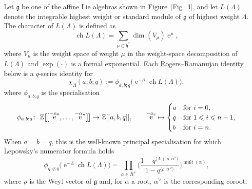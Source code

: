 \documentclass[pdftex]{sigma}
\numberwithin{equation}{section}
\newcommand{\ip}[2]{\langle#1,#2\rangle}
\renewcommand{\leq}{\leqslant}
\DeclareMathOperator{\mult}{mult}
\DeclareMathOperator{\eup}{e}
\DeclareMathOperator{\ch}{ch}
\newcommand{\La}{\Lambda}
\begin{document}
Let $\mathfrak{g}$ be one of the affine Lie algebras shown in
Figure~\ref{Fig_1}, and let $L(\La)$ denote the integrable highest
weight or standard module of $\mathfrak{g}$ of highest weight $\La$.
The character of $L(\La)$ is defined as
\[
\ch L(\La)=\sum_{\mu\in\mathfrak{h}^{\ast}} \dim(V_{\mu}) \eup^{\mu},
\]
where $V_{\mu}$ is the weight space of weight $\mu$ in the weight-space
decomposition of $L(\La)$ and $\exp(\cdot)$ is a formal exponential.
Each Rogers--Ramanujan identity below is a $q$-series identity for
\begin{equation*}%
\chi_{\La}(a,b;q):=\phi_{a,b;q}\bigl(\eup^{-\La} \ch L(\La)\bigr),
\end{equation*}
where $\phi_{a,b;q}$ is the specialisation
\begin{align*}%
\phi_{a,b;q}\colon\ \mathbb{Z}\bigl[\hspace{-0.9pt}\bigl[\eup^{-\alpha_0},\dots,\eup^{-\alpha_n}\bigr]\hspace{-0.9pt}\bigr]
 \to\mathbb{Z}[[a,b,q]], \qquad
\eup^{-\alpha_i}\mapsto \begin{cases}
a & \text{for $i=0$}, \\
q & \text{for $1\leq i\leq n-1$}, \\
b & \text{for $i=n$}. \end{cases}
\end{align*}
When $a=b=q$, this is the well-known principal specialisation
\cite{Lepowsky79} for which Lepowsky's numerator formula
\cite{Lepowsky82} holds
\begin{equation}\label{Eq_Lepowsky}
\phi_{q,q;q}\bigl(\eup^{-\La} \ch L(\La)\bigr)=
\prod_{\alpha\in R^{+}}
\biggl(\frac{1-q^{\ip{\La+\rho}{\alpha^{\vee}}}}
{1-q^{\ip{\rho}{\alpha^{\vee}}}}\biggr)^{\mult(\alpha)},
\end{equation}
where $\rho$ is the Weyl vector of $\mathfrak{g}$ and, for $\alpha$
a root, $\alpha^{\vee}$ is the corresponding coroot.
\end{document}
